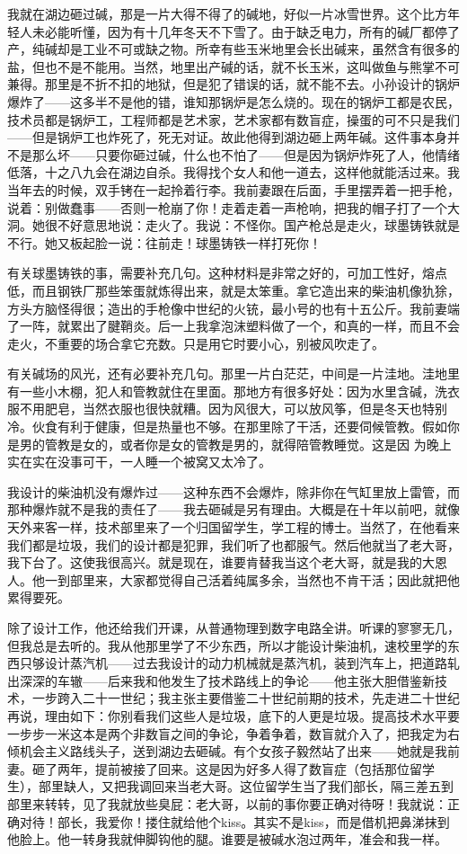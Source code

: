 我就在湖边砸过碱，那是一片大得不得了的碱地，好似一片冰雪世界。这个比方年轻人未必能听懂，因为有十几年冬天不下雪了。由于缺乏电力，所有的碱厂都停了产，纯碱却是工业不可或缺之物。所幸有些玉米地里会长出碱来，虽然含有很多的盐，但也不是不能用。当然，地里出产碱的话，就不长玉米，这叫做鱼与熊掌不可兼得。那里是不折不扣的地狱，但是犯了错误的话，就不能不去。小孙设计的锅炉爆炸了——这多半不是他的错，谁知那锅炉是怎么烧的。现在的锅炉工都是农民，技术员都是锅炉工，工程师都是艺术家，艺术家都有数盲症，操蛋的可不只是我们——但是锅炉工也炸死了，死无对证。故此他得到湖边砸上两年碱。这件事本身并不是那么坏——只要你砸过碱，什么也不怕了——但是因为锅炉炸死了人，他情绪低落，十之八九会在湖边自杀。我得找个女人和他一道去，这样他就能活过来。我当年去的时候，双手铐在一起拎着行李。我前妻跟在后面，手里摆弄着一把手枪，说着：别做蠢事——否则一枪崩了你！走着走着一声枪响，把我的帽子打了一个大洞。她很不好意思地说：走火了。我说：不怪你。国产枪总是走火，球墨铸铁就是不行。她又板起脸一说：往前走！球墨铸铁一样打死你！ 

有关球墨铸铁的事，需要补充几句。这种材料是非常之好的，可加工性好，熔点低，而且钢铁厂那些笨蛋就炼得出来，就是太笨重。拿它造出来的柴油机像犰狳，方头方脑怪得很；造出的手枪像中世纪的火铳，最小号的也有十五公斤。我前妻端了一阵，就累出了腱鞘炎。后一上我拿泡沫塑料做了一个，和真的一样，而且不会走火，不重要的场合拿它充数。只是用它时要小心，别被风吹走了。 

有关碱场的风光，还有必要补充几句。那里一片白茫茫，中间是一片洼地。洼地里有一些小木棚，犯人和管教就住在里面。那地方有很多好处：因为水里含碱，洗衣服不用肥皂，当然衣服也很快就糟。因为风很大，可以放风筝，但是冬天也特别冷。伙食有利于健康，但是热量也不够。在那里除了干活，还要伺候管教。假如你是男的管教是女的，或者你是女的管教是男的，就得陪管教睡觉。这是因 为晚上实在实在没事可干，一人睡一个被窝又太冷了。 

我设计的柴油机没有爆炸过——这种东西不会爆炸，除非你在气缸里放上雷管，而那种爆炸就不是我的责任了——我去砸碱是另有理由。大概是在十年以前吧，就像天外来客一样，技术部里来了一个归国留学生，学工程的博士。当然了，在他看来我们都是垃圾，我们的设计都是犯罪，我们听了也都服气。然后他就当了老大哥，我下台了。这使我很高兴。就是现在，谁要肯替我当这个老大哥，就是我的大恩人。他一到部里来，大家都觉得自己活着纯属多余，当然也不肯干活；因此就把他累得要死。 

除了设计工作，他还给我们开课，从普通物理到数字电路全讲。听课的寥寥无几，但我总是去听的。我从他那里学了不少东西，所以才能设计柴油机，速校里学的东西只够设计蒸汽机——过去我设计的动力机械就是蒸汽机，装到汽车上，把道路轧出深深的车辙——后来我和他发生了技术路线上的争论——他主张大胆借鉴新技术，一步跨入二十一世纪；我主张主要借鉴二十世纪前期的技术，先走进二十世纪再说，理由如下：你别看我们这些人是垃圾，底下的人更是垃圾。提高技术水平要一步步一米这本是两个非数盲之间的争论，争着争着，数盲就介入了，把我定为右倾机会主义路线头子，送到湖边去砸碱。有个女孩子毅然站了出来——她就是我前妻。砸了两年，提前被接了回来。这是因为好多人得了数盲症（包括那位留学生），部里缺人，又把我调回来当老大哥。这位留学生当了我们部长，隔三差五到部里来转转，见了我就放些臭屁：老大哥，以前的事你要正确对待呀！我就说：正确对待！部长，我爱你！搂住就给他个kiss。其实不是kiss，而是借机把鼻涕抹到他脸上。他一转身我就伸脚钩他的腿。谁要是被碱水泡过两年，准会和我一样。 

